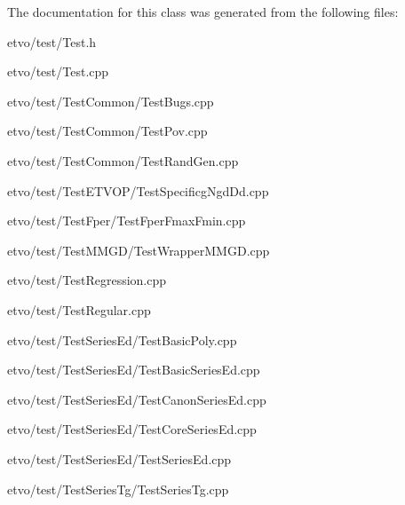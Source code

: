 The documentation for this class was generated from the following files\+:\begin{DoxyCompactItemize}
\item 
etvo/test/Test.\+h\item 
etvo/test/Test.\+cpp\item 
etvo/test/\+Test\+Common/Test\+Bugs.\+cpp\item 
etvo/test/\+Test\+Common/Test\+Pov.\+cpp\item 
etvo/test/\+Test\+Common/Test\+Rand\+Gen.\+cpp\item 
etvo/test/\+Test\+E\+T\+V\+O\+P/Test\+Specificg\+Ngd\+Dd.\+cpp\item 
etvo/test/\+Test\+Fper/Test\+Fper\+Fmax\+Fmin.\+cpp\item 
etvo/test/\+Test\+M\+M\+G\+D/Test\+Wrapper\+M\+M\+G\+D.\+cpp\item 
etvo/test/Test\+Regression.\+cpp\item 
etvo/test/Test\+Regular.\+cpp\item 
etvo/test/\+Test\+Series\+Ed/Test\+Basic\+Poly.\+cpp\item 
etvo/test/\+Test\+Series\+Ed/Test\+Basic\+Series\+Ed.\+cpp\item 
etvo/test/\+Test\+Series\+Ed/Test\+Canon\+Series\+Ed.\+cpp\item 
etvo/test/\+Test\+Series\+Ed/Test\+Core\+Series\+Ed.\+cpp\item 
etvo/test/\+Test\+Series\+Ed/Test\+Series\+Ed.\+cpp\item 
etvo/test/\+Test\+Series\+Tg/Test\+Series\+Tg.\+cpp\end{DoxyCompactItemize}

